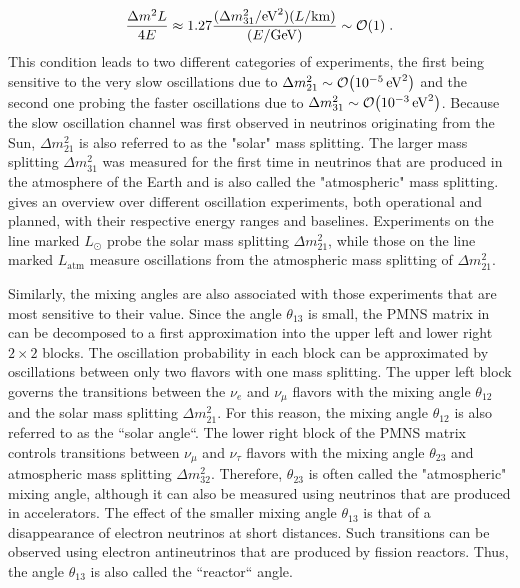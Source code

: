 \begin{equation}
    \frac{\Delta m^2 L}{4E} \approx 1.27\frac{(\Delta m^2_{31}/\si{eV^2})(L/\si{\kilo\meter})}{(E/\si{\giga\electronvolt})} \sim \order{1}\;.
\end{equation}
This condition leads to two different categories of experiments, the first being sensitive to the very slow oscillations due to $\Delta m^2_{21}\sim\order{\SI{e-5}{eV^2}}$ and the second one probing the faster oscillations due to $\Delta m^2_{31}\sim\order{\SI{e-3}{eV^2}}$.
Because the slow oscillation channel was first observed in neutrinos originating from the Sun, $\Delta m^2_{21}$ is also referred to as the "solar" mass splitting.
The larger mass splitting $\Delta m^2_{31}$ was measured for the first time in neutrinos that are produced in the atmosphere of the Earth and is also called the "atmospheric" mass splitting.
 gives an overview over different oscillation experiments, both operational and planned, with their respective energy ranges and baselines.
Experiments on the line marked $L_{\odot}$ probe the solar mass splitting $\Delta m^2_{21}$, while those on the line marked $L_\mathrm{atm}$ measure oscillations from the atmospheric mass splitting of $\Delta m^2_{21}$.

Similarly, the mixing angles are also associated with those experiments that are most sensitive to their value.
Since the angle $\theta_{13}$ is small, the PMNS matrix in  can be decomposed to a first approximation into the upper left and lower right $2\times2$ blocks.
The oscillation probability in each block can be approximated by oscillations between only two flavors with one mass splitting.
The upper left block governs the transitions between the $\nu_e$ and $\nu_\mu$ flavors with the mixing angle $\theta_{12}$ and the solar mass splitting $\Delta m^2_{21}$.
For this reason, the mixing angle $\theta_{12}$ is also referred to as the ``solar angle``.
The lower right block of the PMNS matrix controls transitions between $\nu_\mu$ and $\nu_\tau$ flavors with the mixing angle $\theta_{23}$ and atmospheric mass splitting $\Delta m^2_{32}$.
Therefore, $\theta_{23}$ is often called the "atmospheric" mixing angle, although it can also be measured using neutrinos that are produced in accelerators.
The effect of the smaller mixing angle $\theta_{13}$ is that of a disappearance of electron neutrinos at short distances.
Such transitions can be observed using electron antineutrinos that are produced by fission reactors.
Thus, the angle $\theta_{13}$ is also called the ``reactor`` angle.

